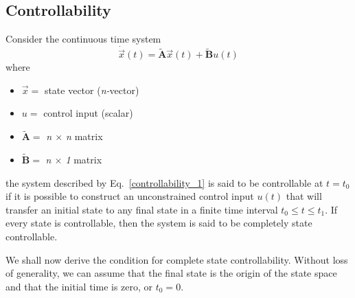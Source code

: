 \documentclass[12pt,a4paper,oneside]{book}
\begin{document}
\begin{onehalfspace}
\section{Controllability}
Consider the continuous time system
\begin{equation} \label{controllability_1}
	\dot{\vec x}(t) = \tilde{\mathbf{A}} \vec x(t) +\tilde{\mathbf{B}}u(t)
\end{equation}
where	\begin{itemize} 
	\item $\vec x = $ state vector (\textit{n-}vector)	
	\item $u = $ control input (scalar)
	\item $ \tilde{\mathbf{A}} = $ \textit{n $\times$ n} matrix
	\item $ \tilde{\mathbf{B}} = $ \textit{n $\times$ 1} matrix
\end{itemize}
the system described by Eq.~\eqref{controllability_1} is said to be 
controllable at $t=t_0$ if it is possible to  construct an unconstrained 
control input $u(t)$ that will transfer an initial state to any final state in 
a finite time interval $t_0\le t\le t_1$. If every state is controllable, then 
the system is said to be completely state controllable. 

We shall now derive the condition for complete state controllability. Without 
loss of generality, we can assume that the final state is the origin of the 
state space and that the initial time is zero, or $t_0=0$.


\end{onehalfspace}
\end{document}
